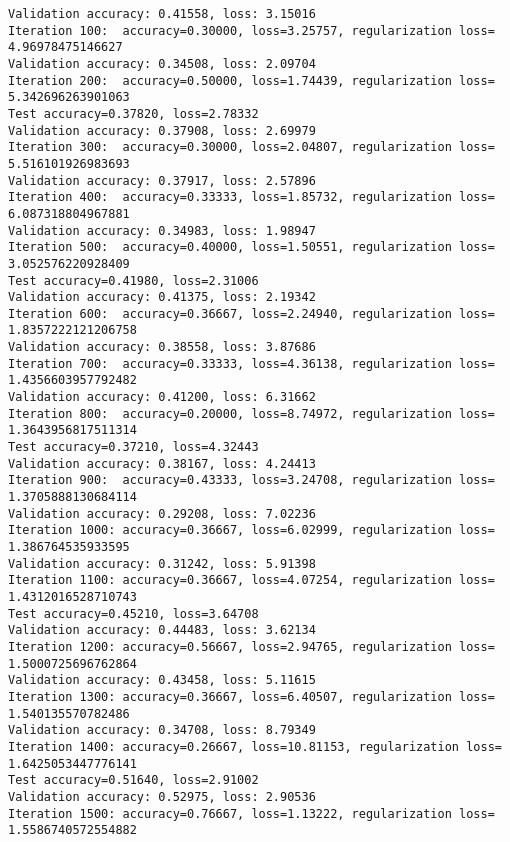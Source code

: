 \documentclass[11pt]{article}
\begin{document}
\begin{Verbatim}[commandchars=\\\{\}]
Validation accuracy: 0.41558, loss: 3.15016
Iteration 100:	accuracy=0.30000, loss=3.25757, regularization loss= 4.96978475146627
Validation accuracy: 0.34508, loss: 2.09704
Iteration 200:	accuracy=0.50000, loss=1.74439, regularization loss= 5.342696263901063
Test accuracy=0.37820, loss=2.78332
Validation accuracy: 0.37908, loss: 2.69979
Iteration 300:	accuracy=0.30000, loss=2.04807, regularization loss= 5.516101926983693
Validation accuracy: 0.37917, loss: 2.57896
Iteration 400:	accuracy=0.33333, loss=1.85732, regularization loss= 6.087318804967881
Validation accuracy: 0.34983, loss: 1.98947
Iteration 500:	accuracy=0.40000, loss=1.50551, regularization loss= 3.052576220928409
Test accuracy=0.41980, loss=2.31006
Validation accuracy: 0.41375, loss: 2.19342
Iteration 600:	accuracy=0.36667, loss=2.24940, regularization loss= 1.8357222121206758
Validation accuracy: 0.38558, loss: 3.87686
Iteration 700:	accuracy=0.33333, loss=4.36138, regularization loss= 1.4356603957792482
Validation accuracy: 0.41200, loss: 6.31662
Iteration 800:	accuracy=0.20000, loss=8.74972, regularization loss= 1.3643956817511314
Test accuracy=0.37210, loss=4.32443
Validation accuracy: 0.38167, loss: 4.24413
Iteration 900:	accuracy=0.43333, loss=3.24708, regularization loss= 1.3705888130684114
Validation accuracy: 0.29208, loss: 7.02236
Iteration 1000:	accuracy=0.36667, loss=6.02999, regularization loss= 1.386764535933595
Validation accuracy: 0.31242, loss: 5.91398
Iteration 1100:	accuracy=0.36667, loss=4.07254, regularization loss= 1.4312016528710743
Test accuracy=0.45210, loss=3.64708
Validation accuracy: 0.44483, loss: 3.62134
Iteration 1200:	accuracy=0.56667, loss=2.94765, regularization loss= 1.5000725696762864
Validation accuracy: 0.43458, loss: 5.11615
Iteration 1300:	accuracy=0.36667, loss=6.40507, regularization loss= 1.540135570782486
Validation accuracy: 0.34708, loss: 8.79349
Iteration 1400:	accuracy=0.26667, loss=10.81153, regularization loss= 1.6425053447776141
Test accuracy=0.51640, loss=2.91002
Validation accuracy: 0.52975, loss: 2.90536
Iteration 1500:	accuracy=0.76667, loss=1.13222, regularization loss= 1.5586740572554882

    \end{Verbatim}
\end{document}
